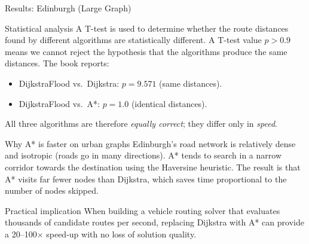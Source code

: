 \documentclass[aspectratio=169,10pt]{beamer}
\begin{document}
\begin{frame}[allowframebreaks]{Results: Edinburgh (Large Graph)}
  \begin{block}{Statistical analysis}
    A T-test is used to determine whether the route distances found by
    different algorithms are statistically different.  A T-test value
    $p > 0.9$ means we cannot reject the hypothesis that the algorithms
    produce the same distances.  The book reports:
    \begin{itemize}
      \item DijkstraFlood vs.\ Dijkstra: $p = 9.571$ (same distances).
      \item DijkstraFlood vs.\ A*: $p = 1.0$ (identical distances).
    \end{itemize}
    All three algorithms are therefore \emph{equally correct}; they differ
    only in \emph{speed}.
  \end{block}

  \begin{alertblock}{Why A* is faster on urban graphs}
    Edinburgh's road network is relatively dense and isotropic (roads
    go in many directions).  A* tends to search in a narrow corridor
    towards the destination using the Haversine heuristic.  The result is
    that A* visits far fewer nodes than Dijkstra, which saves time
    proportional to the number of nodes skipped.
  \end{alertblock}

  \begin{exampleblock}{Practical implication}
    When building a vehicle routing solver that evaluates thousands of
    candidate routes per second, replacing Dijkstra with A* can provide
    a 20--100$\times$ speed-up with no loss of solution quality.
  \end{exampleblock}
\end{frame}
\end{document}
